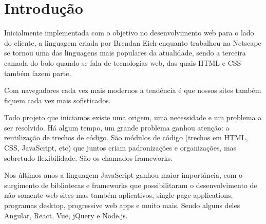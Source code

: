 \documentclass[
	12pt,				%
	openright,			%
	twoside,			%
	a4paper,			%
	english,			%
	brazil				%
	]{abntex2}
\begin{document}

\tableofcontents*
\cleardoublepage


\textual

\chapter{Introdução}

Inicialmente implementada com o objetivo no desenvolvimento web para o lado do
cliente, a linguagem criada por Brendan Eich enquanto trabalhou na Netscape se tornou
uma das linguagens mais populares da atualidade, sendo a terceira camada do bolo quando
se fala de tecnologias web, das quais HTML e CSS também fazem parte. 

Com navegadores cada vez mais modernos a tendência é que nossos sites também fiquem cada vez mais sofisticados.

Todo projeto que iniciamos existe uma origem, uma necessidade e um 
problema a ser resolvido. Há algum tempo, um grande problema ganhou 
atenção: a reutilização de trechos de código. São módulos de código 
(trechos em HTML, CSS, JavaScript, etc) que juntos criam padronizações 
e organizações, mas sobretudo flexibilidade. São os chamados frameworks.

Nos últimos anos a linguagem JavaScript ganhou maior importância, com o
surgimento de bibliotecas e frameworks que possibilitaram o desenvolvimento de não
somente web sites mas também aplicativos, single page applications, programas desktop,
progressive web apps e muito mais. Sendo alguns deles Angular, React, Vue, jQuery e
Node.js.
\end{document}
